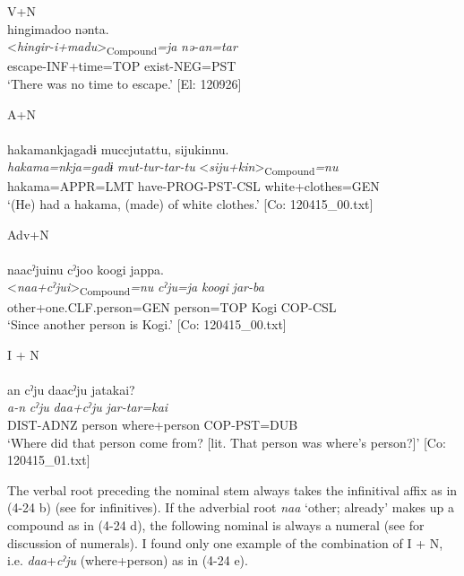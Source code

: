 \ex  V+N\\
\glll    hingimadoo  nənta.\\
      <\textit{hingir-i+madu}>\textsubscript{Compound}\textit{=ja}  \textit{nə-an=tar}\\
      escape-INF+time=TOP  exist-NEG=PST\\
      \glt       ‘There was no time to escape.’ [El: 120926]

\ex A+N\\\\
\glll   hakamankjagadɨ  muccjutattu,  sijukinnu.\\
      \textit{hakama=nkja=gadɨ}  \textit{mut-tur-tar-tu}  <\textit{siju+kin}>\textsubscript{Compound}\textit{=nu}\\
      hakama=APPR=LMT  have-PROG-PST-CSL  white+clothes=GEN\\
      \glt       ‘(He) had a hakama, (made) of white clothes.’ [Co: 120415\_00.txt]

\ex Adv+N\\\\
\glll     naacˀjuinu  cˀjoo  koogi  jappa.\\
      <\textit{naa+cˀjui}>\textsubscript{Compound}\textit{=nu}  \textit{cˀju=ja}  \textit{koogi}  \textit{jar-ba}\\
      other+one.CLF.person=GEN  person=TOP  Kogi  COP-CSL\\
      \glt       ‘Since another person is Kogi.’ [Co: 120415\_00.txt]

\ex I + N\\\\
\glll      an  cˀju  daacˀju  jatakai?\\
      \textit{a-n}  \textit{cˀju}  \textit{daa+cˀju}  \textit{jar-tar=kai}\\
      DIST-ADNZ  person  where+person  COP-PST=DUB\\
      \glt       ‘Where did that person come from? [lit. That person was where’s person?]’ [Co: 120415\_01.txt]
    \z
\z

The verbal root preceding the nominal stem always takes the infinitival affix as in (4-24 b) (see  for infinitives). If the adverbial root \textit{naa} ‘other; already’ makes up a compound as in (4-24 d), the following nominal is always a numeral (see  for discussion of numerals). I found only one example of the combination of I + N, i.e. \textit{daa}+\textit{cˀju} (where+person) as in (4-24 e).

